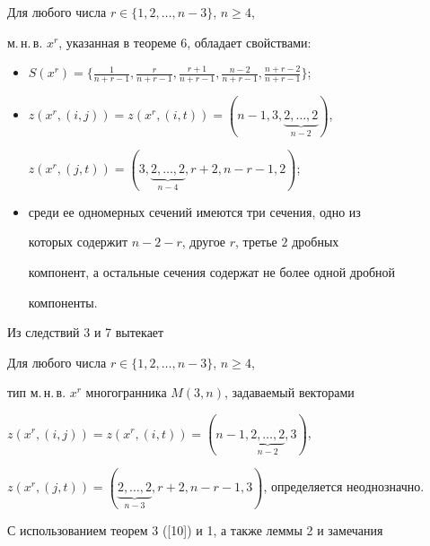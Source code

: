 \begin{cor}


Для любого числа $r\in \{1,2,\dotsc,n-3\}$, $n\geq 4$,


м.\,н.\,в. $x^r$, указанная в теореме 6, обладает свойствами:


\begin{itemize}


\item[1)] $S(x^r)=\{\frac{1}{n+r-1},\frac{r}{n+r-1},


\frac{r+1}{n+r-1},\frac{n-2}{n+r-1},\frac{n+r-2}{n+r-1} \}$;


\item[2)] $z(x^r,(i,j))=z(x^r,(i,t))=(n-1,3,


\underbrace{2,\dotsc,2}_{n-2})$,


$z(x^r,(j,t))=(3,\underbrace{2,\dotsc,2}_{n-4},r+2,n-r-1,2)$;


\item[3)] среди ее одномерных сечений имеются три сечения, одно из


которых содержит $n-2-r$, другое $r$, третье $2$ дробных


компонент, а остальные сечения содержат не более одной дробной


компоненты.


\end{itemize}


\end{cor}





Из следствий 3 и 7 вытекает





\begin{cor}


Для любого числа $r\in \{1,2,\dotsc,n-3\}$, $n\geq 4$,


тип м.\,н.\,в. $x^r$ многогранника $M(3,n)$, задаваемый векторами


$z(x^r,(i,j))=z(x^r,(i,t))=(n-1,\underbrace{2,\dotsc,2}_{n-2},3)$,


$z(x^r,(j,t))=(\underbrace{2,\dotsc,2}_{n-3}


,r+2,n-r-1,3)$, определяется неоднозначно.


\end{cor}





С использованием теорем 3 ([10]) и 1, а также леммы 2 и замечания


